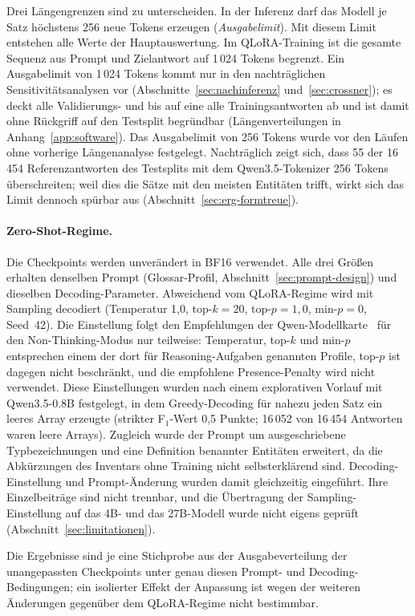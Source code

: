 Drei Längengrenzen sind zu unterscheiden.
In der Inferenz darf das Modell je Satz höchstens 256 neue Tokens
erzeugen (\emph{Ausgabelimit}). Mit diesem Limit entstehen alle Werte
der Hauptauswertung.
Im QLoRA-Training ist die gesamte Sequenz aus Prompt und Zielantwort auf
1\,024 Tokens begrenzt.
Ein Ausgabelimit von 1\,024 Tokens kommt nur in den nachträglichen
Sensitivitätsanalysen vor (Abschnitte~\ref{sec:nachinferenz}
und~\ref{sec:crossner}); es deckt alle Validierungs- und bis auf eine
alle Trainingsantworten ab und ist damit ohne Rückgriff auf den Testsplit
begründbar (Längenverteilungen in Anhang~\ref{app:software}).
Das Ausgabelimit von 256 Tokens wurde vor den Läufen ohne vorherige
Längenanalyse festgelegt.
Nachträglich zeigt sich, dass 55 der 16\,454 Referenzantworten des
Testsplits mit dem Qwen3.5-Tokenizer 256 Tokens überschreiten; weil
dies die Sätze mit den meisten Entitäten trifft, wirkt sich das Limit
dennoch spürbar aus (Abschnitt~\ref{sec:erg-formtreue}).

\paragraph{Zero-Shot-Regime.}
Die Checkpoints werden unverändert in BF16 verwendet. Alle drei Größen
erhalten denselben Prompt (Glossar-Profil,
Abschnitt~\ref{sec:prompt-design}) und dieselben Decoding-Parameter.
Abweichend vom QLoRA-Regime wird mit Sampling decodiert (Temperatur 1,0,
top-$k = 20$, top-$p = 1{,}0$, min-$p = 0$, Seed~42).
Die Einstellung folgt den Empfehlungen der
Qwen-Modellkarte~\cite{qwen2026card27b} für den Non-Thinking-Modus nur
teilweise: Temperatur, top-$k$ und min-$p$ entsprechen einem der dort
für Reasoning-Aufgaben genannten Profile, top-$p$ ist dagegen nicht
beschränkt, und die empfohlene Presence-Penalty wird nicht verwendet.
Diese Einstellungen wurden nach einem explorativen Vorlauf mit
Qwen3.5-0.8B festgelegt, in dem Greedy-Decoding für nahezu jeden Satz ein
leeres Array erzeugte (strikter F$_1$-Wert 0,5 Punkte; 16\,052 von 16\,454
Antworten waren leere Arrays).
Zugleich wurde der Prompt um ausgeschriebene Typbezeichnungen und eine
Definition benannter Entitäten erweitert, da die Abkürzungen des
Inventars ohne Training nicht selbsterklärend sind.
Decoding-Einstellung und Prompt-Änderung wurden damit gleichzeitig
eingeführt. Ihre Einzelbeiträge sind nicht trennbar, und die Übertragung
der Sampling-Einstellung auf das 4B- und das 27B-Modell wurde nicht
eigens geprüft (Abschnitt~\ref{sec:limitationen}).

Die Ergebnisse sind je eine Stichprobe aus der Ausgabeverteilung der
unangepassten Checkpoints unter genau diesen Prompt- und
Decoding-Bedingungen; ein isolierter Effekt der Anpassung ist wegen der
weiteren Änderungen gegenüber dem QLoRA-Regime nicht bestimmbar.

